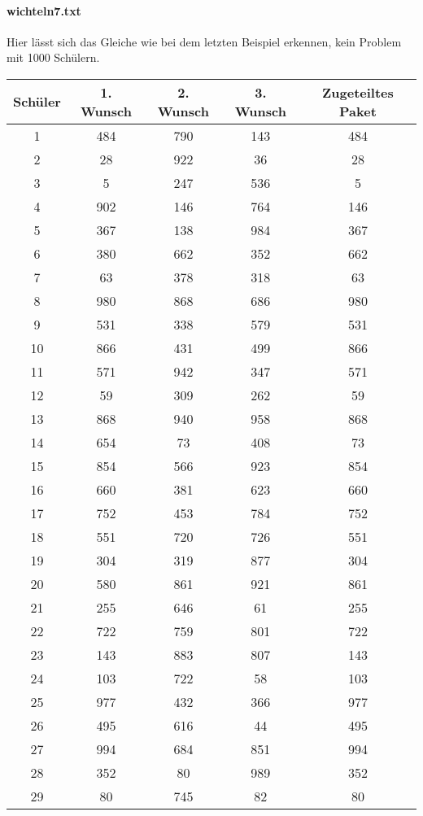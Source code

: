 \documentclass[a4paper,10pt,ngerman]{scrartcl}
\begin{document}
\paragraph{wichteln7.txt}
Hier lässt sich das Gleiche wie bei dem letzten Beispiel erkennen, kein Problem mit 1000 Schülern.
\begin{longtable}[c]{c|c|c|c|c}
    Schüler & 1. Wunsch & 2. Wunsch & 3. Wunsch & Zugeteiltes Paket \\
    \hline
    \endhead
    1 & 484 & 790 & 143 & 484 \\
    2 & 28 & 922 & 36 & 28 \\
    3 & 5 & 247 & 536 & 5 \\
    4 & 902 & 146 & 764 & 146 \\
    5 & 367 & 138 & 984 & 367 \\
    6 & 380 & 662 & 352 & 662 \\
    7 & 63 & 378 & 318 & 63 \\
    8 & 980 & 868 & 686 & 980 \\
    9 & 531 & 338 & 579 & 531 \\
    10 & 866 & 431 & 499 & 866 \\
    11 & 571 & 942 & 347 & 571 \\
    12 & 59 & 309 & 262 & 59 \\
    13 & 868 & 940 & 958 & 868 \\
    14 & 654 & 73 & 408 & 73 \\
    15 & 854 & 566 & 923 & 854 \\
    16 & 660 & 381 & 623 & 660 \\
    17 & 752 & 453 & 784 & 752 \\
    18 & 551 & 720 & 726 & 551 \\
    19 & 304 & 319 & 877 & 304 \\
    20 & 580 & 861 & 921 & 861 \\
    21 & 255 & 646 & 61 & 255 \\
    22 & 722 & 759 & 801 & 722 \\
    23 & 143 & 883 & 807 & 143 \\
    24 & 103 & 722 & 58 & 103 \\
    25 & 977 & 432 & 366 & 977 \\
    26 & 495 & 616 & 44 & 495 \\
    27 & 994 & 684 & 851 & 994 \\
    28 & 352 & 80 & 989 & 352 \\
    29 & 80 & 745 & 82 & 80 \\

\end{longtable}
\end{document}
